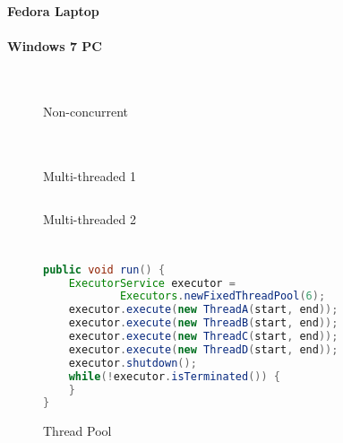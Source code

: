 \documentclass[]{report}
\begin{document}
\subsubsection{Fedora Laptop}
\subsubsection{Windows 7 PC}


\appendix
\chapter{}
\begin{figure}[h!]
	\caption{Non-concurrent}
	\begin{lstlisting}[language=Java,frame=single]

	\end{lstlisting}
\end{figure}

\chapter{}
\begin{figure}[h!]
	\caption{Multi-threaded 1}
	\begin{lstlisting}[language=Java,frame=single]

	\end{lstlisting}
\end{figure}

\begin{figure}[h!]
	\caption{Multi-threaded 2}
	\begin{lstlisting}[language=Java,frame=single]

	\end{lstlisting}
\end{figure}

\chapter{}
\begin{figure}[h!]
	\caption{Thread Pool}
	\begin{lstlisting}[language=Java,frame=single]
public void run() {
	ExecutorService executor =
			Executors.newFixedThreadPool(6);
	executor.execute(new ThreadA(start, end));
	executor.execute(new ThreadB(start, end));
	executor.execute(new ThreadC(start, end));
	executor.execute(new ThreadD(start, end));
	executor.shutdown();
	while(!executor.isTerminated()) {
	}
}
	\end{lstlisting}
\end{figure}
\end{document}
